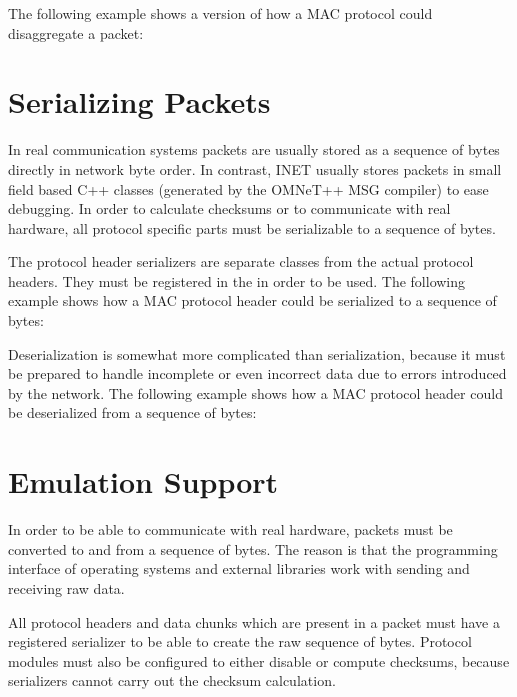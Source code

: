 
The following example shows a version of how a MAC protocol could disaggregate a
packet:


\section{Serializing Packets}
\label{sec:packets:serializing-packets}

In real communication systems packets are usually stored as a sequence of bytes
directly in network byte order. In contrast, INET usually stores packets in
small field based C++ classes (generated by the OMNeT++ MSG compiler) to ease
debugging. In order to calculate checksums or to communicate with real hardware,
all protocol specific parts must be serializable to a sequence of bytes.

The protocol header serializers are separate classes from the actual protocol
headers. They must be registered in the  in
order to be used. The following example shows how a MAC protocol header could be
serialized to a sequence of bytes:


Deserialization is somewhat more complicated than serialization, because it must
be prepared to handle incomplete or even incorrect data due to errors introduced
by the network. The following example shows how a MAC protocol header could be
deserialized from a sequence of bytes:


\section{Emulation Support}
\label{sec:packets:emulation-support}

In order to be able to communicate with real hardware, packets must be converted
to and from a sequence of bytes. The reason is that the programming interface of
operating systems and external libraries work with sending and receiving raw
data.

All protocol headers and data chunks which are present in a packet must have a
registered serializer to be able to create the raw sequence of bytes. Protocol
modules must also be configured to either disable or compute checksums, because
serializers cannot carry out the checksum calculation.


